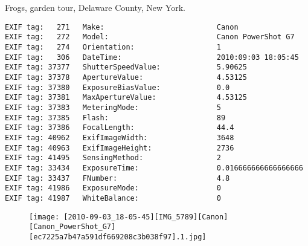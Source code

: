 \section{\protect{}}
\noindent Frogs, garden tour, Delaware County, New York.
\noindent
\begin{lstlisting}
EXIF tag:   271   Make:                          Canon
EXIF tag:   272   Model:                         Canon PowerShot G7
EXIF tag:   274   Orientation:                   1
EXIF tag:   306   DateTime:                      2010:09:03 18:05:45
EXIF tag: 37377   ShutterSpeedValue:             5.90625
EXIF tag: 37378   ApertureValue:                 4.53125
EXIF tag: 37380   ExposureBiasValue:             0.0
EXIF tag: 37381   MaxApertureValue:              4.53125
EXIF tag: 37383   MeteringMode:                  5
EXIF tag: 37385   Flash:                         89
EXIF tag: 37386   FocalLength:                   44.4
EXIF tag: 40962   ExifImageWidth:                3648
EXIF tag: 40963   ExifImageHeight:               2736
EXIF tag: 41495   SensingMethod:                 2
EXIF tag: 33434   ExposureTime:                  0.016666666666666666
EXIF tag: 33437   FNumber:                       4.8
EXIF tag: 41986   ExposureMode:                  0
EXIF tag: 41987   WhiteBalance:                  0

\end{lstlisting}
\clearpage
\begin{figure}
\raggedleft
\texttt{[image: [2010-09-03\_18-05-45][IMG\_5789][Canon][Canon\_PowerShot\_G7][ec7225a7b47a591df669208c3b038f97].1.jpg]}
\end{figure}


\clearpage
